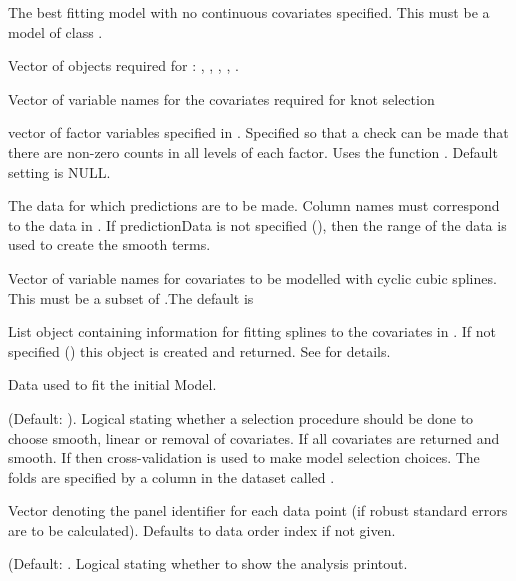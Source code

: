 \documentclass[a4paper]{book}
\begin{document}
\begin{Arguments}
\begin{ldescription}
\item[\code{initialModel}] The best fitting  model with no continuous covariates specified.  This must be a model of class .

\item[\code{salsa1dlist}] Vector of objects required for : , , ,  ,  .

\item[\code{varlist}] Vector of variable names for the covariates required for knot selection

\item[\code{factorlist}] vector of factor variables specified in .  Specified so that a check can be made that there are non-zero counts in all levels of each factor. Uses the function . Default setting is NULL.

\item[\code{predictionData}] The data for which predictions are to be made. Column names must correspond to the data in . If predictionData is not specified (), then the range of the data is used to create the smooth terms.

\item[\code{varlist\_cyclicSplines}] Vector of variable names for covariates to be modelled with cyclic cubic splines.  This must be a subset of .The default is 

\item[\code{splineParams}] List object containing information for fitting splines to the covariates in . If not specified () this object is created and returned. See  for details.

\item[\code{datain}] Data used to fit the initial Model.

\item[\code{removal}] (Default: ). Logical stating whether a selection procedure should be done to choose smooth, linear or removal of covariates.  If  all covariates are returned and smooth. If  then cross-validation is used to make model selection choices. The folds are specified by a column in the dataset called .

\item[\code{panelid}] Vector denoting the panel identifier for each data point (if robust standard errors are to be calculated). Defaults to data order index if not given.

\item[\code{suppress.printout}] (Default: . Logical stating whether to show the analysis printout.
\end{ldescription}
\end{Arguments}
\end{document}
